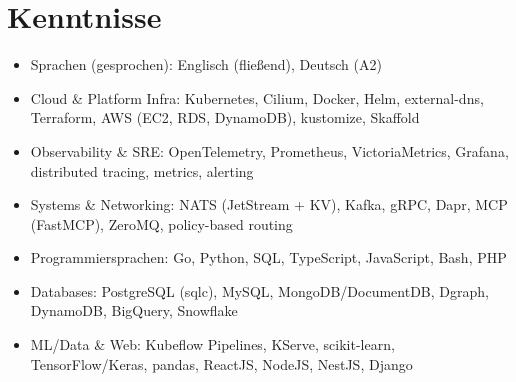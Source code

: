 \documentclass[10pt,a4paper]{resume}
\begin{document}
\section{Kenntnisse}

\begin{itemize}[leftmargin=1.4em,nosep,topsep=2pt]
  \item Sprachen (gesprochen): Englisch (fließend), Deutsch (A2)
  \item Cloud \& Platform Infra: Kubernetes, Cilium, Docker, Helm, external-dns, Terraform, AWS (EC2, RDS, DynamoDB), kustomize, Skaffold
  \item Observability \& SRE: OpenTelemetry, Prometheus, VictoriaMetrics, Grafana, distributed tracing, metrics, alerting
  \item Systems \& Networking: NATS (JetStream + KV), Kafka, gRPC, Dapr, MCP (FastMCP), ZeroMQ, policy-based routing
  \item Programmiersprachen: Go, Python, SQL, TypeScript, JavaScript, Bash, PHP
  \item Databases: PostgreSQL (sqlc), MySQL, MongoDB/DocumentDB, Dgraph, DynamoDB, BigQuery, Snowflake
  \item ML/Data \& Web: Kubeflow Pipelines, KServe, scikit-learn, TensorFlow/Keras, pandas, ReactJS, NodeJS, NestJS, Django
\end{itemize}
\end{document}
